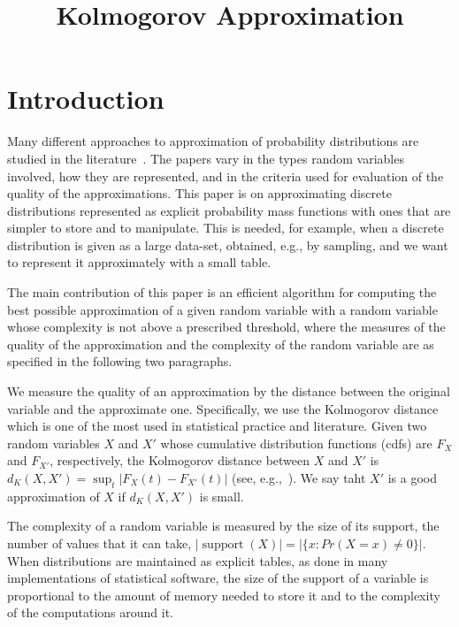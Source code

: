 \documentclass{article}
\title{Kolmogorov Approximation}
\DeclareMathOperator{\support}{support}
\begin{document}

\maketitle

\section{Introduction}

Many different approaches to approximation of probability distributions are studied in the literature~\cite{AMCR83,pavlikov2016cvar,PS77}. 
The papers vary in the types random variables involved, how they are represented, and in the criteria used for evaluation of the quality of the approximations. This paper is on approximating discrete distributions represented as explicit probability mass functions with ones that are simpler to store and to manipulate. This is needed, for example, when a discrete distribution is given as a large data-set, obtained, e.g., by sampling, and we want to represent it approximately with a small table.  

The main contribution of this paper is an efficient algorithm for computing the best possible approximation of a given random variable with a random variable whose complexity is not above a prescribed threshold, where the measures of the quality of the approximation and the complexity of the random variable are as specified in the following two paragraphs. 

We measure the quality of an approximation by the distance between the original variable and the approximate one. Specifically, we use the Kolmogorov distance which is one of the most used in statistical practice and literature. Given two random variables $X$ and $X'$ whose cumulative distribution functions (cdfs) are $F_X$ and $F_{X'}$, respectively, the Kolmogorov distance between $X$ and $X'$ is $d_K(X,X')= \sup_t |F_X(t) - F_{X'}(t)|$ (see, e.g.,~\cite{gibbons2011nonparametric}). We say taht $X'$ is a good approximation of $X$ if $d_K(X,X')$ is small.

The complexity of a random variable is measured by the size of its support, the number of values that it can take, $|\support(X)|=|\{x\colon Pr(X=x) \neq 0\}|$. When distributions are maintained as explicit tables, as done in many implementations of statistical software, the size of the support of a variable is proportional to the amount of memory needed to store it and to the complexity of the computations around it. 
\end{document}
